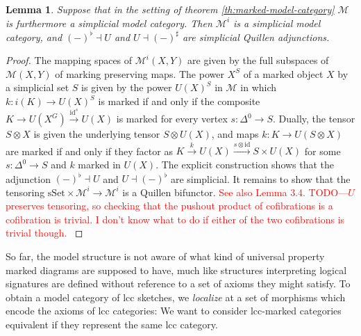 \documentclass{article}
\newcommand{\todo}[1]{\textcolor{red}{#1}}
\newtheorem{lemma}{Lemma}
\begin{document}
\begin{lemma}
  \label{lem:simplicial-marked-objects}
  Suppose that in the setting of theorem \ref{th:marked-model-category} $\mathcal{M}$ is furthermore a simplicial model category.
  Then $\mathcal{M}^i$ is a simplicial model category, and $(-)^\flat \dashv U$ and $U \dashv (-)^\sharp$ are simplicial Quillen adjunctions.
\end{lemma}
\begin{proof}
  The mapping spaces of $\mathcal{M}^i(X, Y)$ are given by the full subspaces of $\mathcal{M}(X, Y)$ of marking preserving maps.
  The power $X^S$ of a marked object $X$ by a simplicial set $S$ is given by the power $U(X)^S$ in $\mathcal{M}$ in which $k : i(K) \rightarrow U(X)^S$ is marked if and only if the composite $K \rightarrow U(X^G) \xrightarrow{\mathrm{id}^s} U(X)$ is marked for every vertex $s : \Delta^0 \rightarrow S$.
  Dually, the tensor $S \otimes X$ is given the underlying tensor $S \otimes U(X)$, and maps $k : K \rightarrow U(S \otimes X)$ are marked if and only if they factor as $K \xrightarrow{k} U(X) \xrightarrow{s \otimes \mathrm{id}} S \times U(X)$ for some $s : \Delta^0 \rightarrow S$ and $k$ marked in $U(X)$.
  The explicit construction shows that the adjunction $(-)^\flat \dashv U$ and $U \dashv (-)^\flat$ are simplicial.
  It remains to show that the tensoring $\mathrm{sSet} \times \mathcal{M}^i \rightarrow \mathcal{M}^i$ is a Quillen bifunctor.
  \todo{
    See also \cite{marked-objects} Lemma 3.4.
    TODO---$U$ preserves tensoring, so checking that the pushout product of cofibrations is a cofibration is trivial.
    I don't know what to do if either of the two cofibrations is trivial though.
  }
\end{proof}

So far, the model structure is not aware of what kind of universal property marked diagrams are supposed to have, much like structures interpreting logical signatures are defined without reference to a set of axioms they might satisfy.
To obtain a model category of lcc sketches, we \emph{localize} at a set of morphisms which encode the axioms of lcc categories:
We want to consider lcc-marked categories equivalent if they represent the same lcc category.
\end{document}
